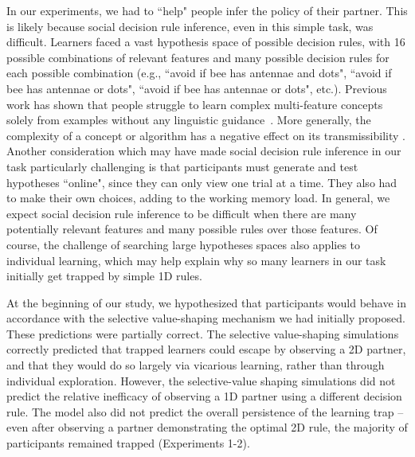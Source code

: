 \documentclass[11pt]{article} %
\begin{document}
In our experiments, we had to ``help" people infer the policy of their partner.  This is likely because social decision rule inference, even in this simple task, was difficult. Learners faced a vast hypothesis space of possible decision rules, with 16 possible combinations of relevant features and many possible decision rules for each possible combination (e.g., ``avoid if bee has antennae and dots", ``avoid if bee has antennae or dots", ``avoid if bee has antennae or dots", etc.). Previous work has shown that people struggle to learn complex multi-feature concepts solely from examples without any linguistic guidance~\cite{sumersShowTellExploring2023}. More generally, the complexity of a concept or algorithm has a negative effect on its transmissibility \cite{thompsonComplexCognitiveAlgorithms2022a}. Another consideration which may have made social decision rule inference in our task particularly challenging is that participants must generate and test hypotheses ``online", since they can only view one trial at a time. They also had to make their own choices, adding to the working memory load. In general, we expect social decision rule inference to be difficult when there are many potentially relevant features and many possible rules over those features. Of course, the challenge of searching large hypotheses spaces also applies to individual learning, which may help explain why so many learners in our task initially get trapped by simple 1D rules. 

At the beginning of our study, we hypothesized that participants would behave in accordance with the selective value-shaping mechanism we had initially proposed. These predictions were partially correct. The selective value-shaping simulations correctly predicted that trapped learners could escape by observing a 2D partner, and that they would do so largely via vicarious learning, rather than through individual exploration. However, the selective-value shaping simulations did not predict the relative inefficacy of observing a 1D partner using a different decision rule. The model also did not predict the overall persistence of the learning trap -- even after observing a partner demonstrating the optimal 2D rule, the majority of participants remained trapped (Experiments 1-2). 
\end{document}
